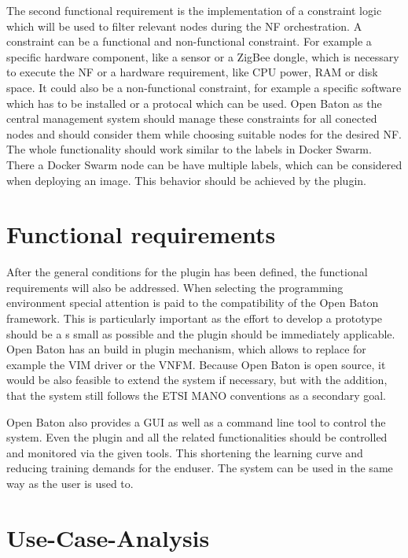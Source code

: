 The second functional requirement is the implementation of a constraint logic which will be used to filter relevant nodes during the \ac{NF} orchestration.
A constraint can be a functional and non-functional constraint.
For example a specific hardware component, like a sensor or a ZigBee dongle, which is necessary to execute the \ac{NF} or a hardware requirement, like \ac{CPU} power, \ac{RAM} or disk space.
It could also be a non-functional constraint, for example a specific software which has to be installed or a protocal which can be used.
Open Baton as the central management system should manage these constraints for all conected nodes and should consider them while choosing suitable nodes for the desired \ac{NF}.
The whole functionality should work similar to the labels in Docker Swarm.
There a Docker Swarm node can be have multiple labels, which can be considered when deploying an image.
This behavior should be achieved by the plugin.


\section{Functional requirements}
After the general conditions for the plugin has been defined, the functional requirements will also be addressed.
When selecting the programming environment special attention is paid to the compatibility of the Open Baton framework.
This is particularly important as the effort to develop a prototype should be a s small as possible and the plugin should be immediately applicable.
Open Baton has an build in plugin mechanism, which allows to replace for example the \ac{VIM} driver or the \ac{VNFM}.
Because Open Baton is open source, it would be also feasible to extend the system if necessary, but with the addition, that the system still follows the \ac{ETSI} \ac{MANO} conventions as a secondary goal.

Open Baton also provides a \ac{GUI} as well as a command line tool to control the system.
Even the plugin and all the related functionalities should be controlled and monitored via the given tools.
This shortening the learning curve and reducing training demands for the enduser.
The system can be used in the same way as the user is used to.

\section{Use-Case-Analysis}
\doit

